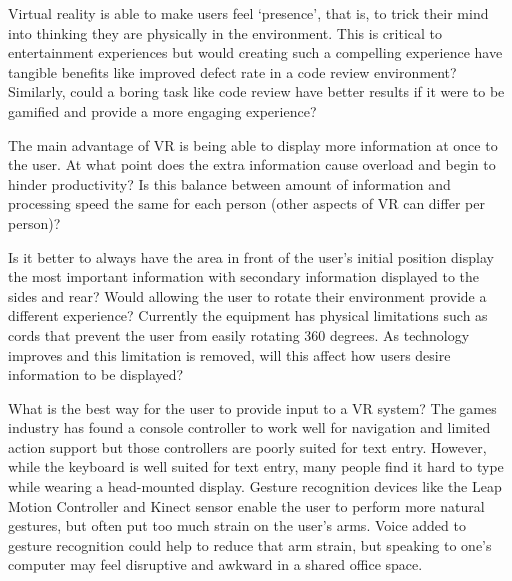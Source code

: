 \documentclass[conference]{IEEEtran}
\begin{document}
Virtual reality is able to make users feel `presence', that is, to trick their mind into thinking they are physically in the environment. 
This is critical to entertainment experiences but would creating such a compelling experience have tangible benefits like improved defect rate in a code review environment? 
Similarly, could a boring task like code review have better results if it were to be gamified and provide a more engaging experience? 

The main advantage of VR is being able to display more information at once to the user.  
At what point does the extra information cause overload and begin to hinder productivity?  
Is this balance between amount of information and processing speed the same for each person (other aspects of VR can differ per person)?

Is it better to always have the area in front of the user's initial position display the most important information with secondary information displayed to the sides and rear? 
Would allowing the user to rotate their environment provide a different experience?
Currently the equipment has physical limitations such as cords that prevent the user from easily rotating 360 degrees. 
As technology improves and this limitation is removed, will this affect how users desire information to be displayed?



What is the best way for the user to provide input to a VR system? 
The games industry has found a console controller to work well for navigation and limited action support but those controllers are poorly suited for text entry. 
However, while the keyboard is well suited for text entry, many people find it hard to type while wearing a head-mounted display. 
Gesture recognition devices like the Leap Motion Controller and Kinect sensor enable the user to perform more natural gestures, but often put too much strain on the user's arms. 
Voice added to gesture recognition could help to reduce that arm strain, but speaking to one's computer may feel disruptive and awkward in a shared office space.
\end{document}
